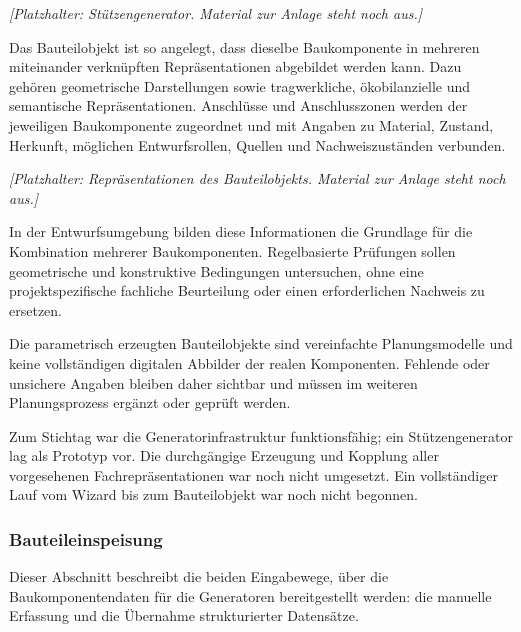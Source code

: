 \documentclass[type=zwischenbericht]{zukunftbau}
\begin{document}
\begin{Figure}[title=Stützengenerator]
\textit{[Platzhalter: Stützengenerator. Material zur Anlage steht noch aus.]}
\end{Figure}

Das Bauteilobjekt ist so angelegt, dass dieselbe Baukomponente in mehreren miteinander verknüpften Repräsentationen abgebildet werden kann. Dazu gehören geometrische Darstellungen sowie tragwerkliche, ökobilanzielle und semantische Repräsentationen. Anschlüsse und Anschlusszonen werden der jeweiligen Baukomponente zugeordnet und mit Angaben zu Material, Zustand, Herkunft, möglichen Entwurfsrollen, Quellen und Nachweiszuständen verbunden.

\begin{Figure}[title=Repräsentationen des Bauteilobjekts]
\textit{[Platzhalter: Repräsentationen des Bauteilobjekts. Material zur Anlage steht noch aus.]}
\end{Figure}

In der Entwurfsumgebung bilden diese Informationen die Grundlage für die Kombination mehrerer Baukomponenten. Regelbasierte Prüfungen sollen geometrische und konstruktive Bedingungen untersuchen, ohne eine projektspezifische fachliche Beurteilung oder einen erforderlichen Nachweis zu ersetzen.

Die parametrisch erzeugten Bauteilobjekte sind vereinfachte Planungsmodelle und keine vollständigen digitalen Abbilder der realen Komponenten. Fehlende oder unsichere Angaben bleiben daher sichtbar und müssen im weiteren Planungsprozess ergänzt oder geprüft werden.

Zum Stichtag war die Generatorinfrastruktur funktionsfähig; ein Stützengenerator lag als Prototyp vor. Die durchgängige Erzeugung und Kopplung aller vorgesehenen Fachrepräsentationen war noch nicht umgesetzt. Ein vollständiger Lauf vom Wizard bis zum Bauteilobjekt war noch nicht begonnen.

\subsubsection{Bauteileinspeisung}
Dieser Abschnitt beschreibt die beiden Eingabewege, über die Baukomponentendaten für die Generatoren bereitgestellt werden: die manuelle Erfassung und die Übernahme strukturierter Datensätze.
\end{document}
